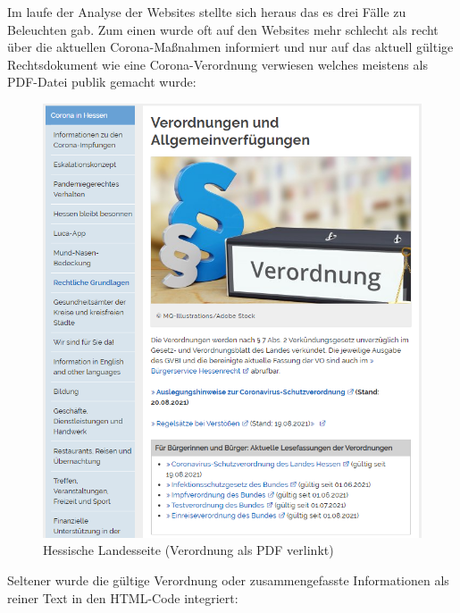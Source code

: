 \documentclass[12pt,oneside,a4paper,parskip]{scrbook}
\begin{document}
Im laufe der Analyse der Websites stellte sich heraus das es drei Fälle zu Beleuchten gab. Zum einen wurde oft auf den Websites mehr schlecht als recht über die aktuellen Corona-Maßnahmen informiert und nur auf das aktuell gültige Rechtsdokument wie eine Corona-Verordnung verwiesen welches meistens als PDF-Datei publik gemacht wurde:
\begin{figure}[h!]
\caption{Hessische Landesseite (Verordnung als PDF verlinkt)}
\label{websiteHessen}
\centering
\includegraphics[scale=0.9]{images/hessenOverview.png}
\end{figure} 

Seltener wurde die gültige Verordnung oder zusammengefasste Informationen als reiner Text in den HTML-Code integriert:
\end{document}
